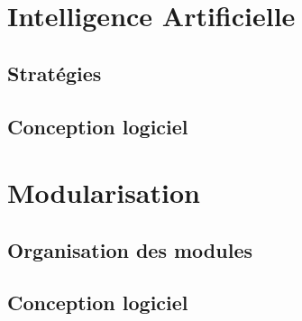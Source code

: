 \documentclass[a4paper,12pt]{article}
\begin{document}
\section{Intelligence Artificielle}

\subsection{Stratégies}

\clearpage
\subsection{Conception logiciel}




\section{Modularisation}
\label{sec:module}

\subsection{Organisation des modules}

\clearpage
\subsection{Conception logiciel}


%
\end{document}
